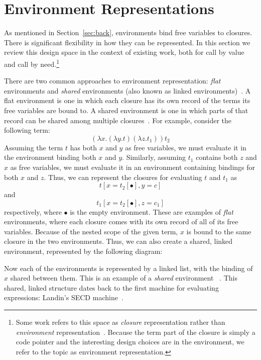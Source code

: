 \section{Environment Representations} \label{sec:env}

As mentioned in Section~\ref{sec:back}, environments bind free variables to
closures. There is significant flexibility in how they can be represented. In
this section we review this design space in the context of existing work, both
for call by value and call by need.\footnote{Some work refers to this
space as \emph{closure} representation rather than \emph{environment}
representation~\cite{shao1994space,appel1988optimizing}.  Because the term
part of the closure is simply a code pointer and the
interesting design choices are in the environment, we refer to
the topic as environment representation.}

There are two common approaches to environment representation: \emph{flat}
environments and \emph{shared} environments (also known as linked
environments)~\cite{appel1988optimizing,shao1994space}. A flat environment is
one in which each closure has its own record of the terms its free variables are
bound to. A shared environment is one in which parts of that record can be
shared among multiple closures~\cite{appel1988optimizing,shao1994space}. For
example, consider the following term: $$(\lambda x.(\lambda y.t) (\lambda
z.t_1)) t_2$$ Assuming the term $t$ has both $x$ and $y$ as free variables, we
must evaluate it in the environment binding both $x$ and $y$.  Similarly,
assuming $t_1$ contains both $z$ and $x$ as free variables, we must evaluate it
in an environment containing bindings for both $x$ and $z$. Thus, we can
represent the closures for evaluating $t$ and $t_1$  as $$t[x=t_2[\bullet],
y=c]$$ and $$t_1[x=t_2[\bullet], z=c_1]$$ respectively, where $\bullet$ is the
empty environment.  These are examples of \emph{flat} environments, where each
closure comes with its own record of all of its free variables. Because of the
nested scope of the given term, $x$ is bound to the same closure in the two
environments. Thus, we can also create a shared, linked environment,
represented by the following diagram:

\begin{center}
\end{center}
Now each of the environments is represented by a linked list, with the binding
of $x$ shared between them. This is an example of a \emph{shared} environment
~\cite{appel1988optimizing}. This shared, linked structure dates back to the 
first machine for evaluating expressions: Landin's SECD
machine~\cite{landin1964mechanical}.


